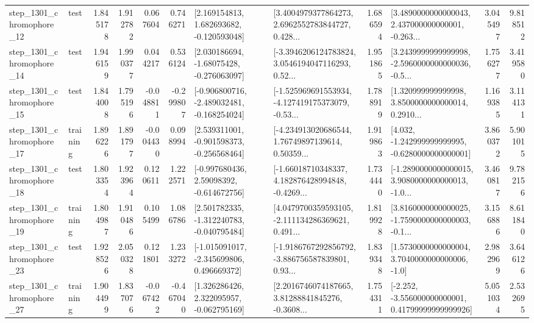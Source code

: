 \begin{tabular}{llrrrrllrlrr}
 step\_1301\_chromophore\_12 &      test &      1.845178 &    1.912782 &      0.067604 &  0.746271 &    [2.169154813, 1.682693682, -0.120593048] &  [3.4004979377864273, 2.6962552783844727, 0.428... &       1.686594 &  [3.4890000000000043, 2.437000000000001, -0.263... &            3.045497 &          9.818512 \\
 step\_1301\_chromophore\_14 &      test &      1.946159 &    1.990377 &      0.044217 &  0.536124 &    [2.030186694, -1.68075428, -0.276063097] &  [-3.3946206124783824, 3.0546194047116293, 0.52... &       1.951865 &  [3.2439999999999998, -2.5960000000000036, -0.5... &            1.756277 &          3.419580 \\
 step\_1301\_chromophore\_15 &      test &      1.844008 &    1.795196 &     -0.048811 & -0.299807 &  [-0.906800716, -2.489032481, -0.168254024] &  [-1.525969691553934, -4.127419175373079, -0.53... &       1.788919 &  [1.320999999999998, 3.8500000000000014, 0.2910... &            1.169385 &          3.114131 \\
 step\_1301\_chromophore\_17 &  training &      1.896226 &    1.891797 &     -0.004430 &  0.098994 &   [2.539311001, -0.901598373, -0.256568464] &  [-4.234913020686544, 1.76749897139614, 0.50359... &       1.919863 &   [4.032, -1.242999999999995, -0.6280000000000001] &            3.860372 &          5.901015 \\
 step\_1301\_chromophore\_18 &      test &      1.803354 &    1.923964 &      0.120611 &  1.222571 &    [-0.997680436, 2.59098392, -0.614672756] &  [-1.66018710348337, 4.182876428994848, -0.4269... &       1.734440 &  [-1.2890000000000015, 3.9080000000000013, -1.0... &            3.460817 &          9.782156 \\
 step\_1301\_chromophore\_19 &  training &      1.804987 &    1.910486 &      0.105499 &  1.086786 &   [2.501782335, -1.312240783, -0.040795484] &  [4.0479700359593105, -2.111134286369621, 0.491... &       1.819928 &  [3.8160000000000025, -1.7590000000000003, -0.1... &            3.156886 &          8.611840 \\
 step\_1301\_chromophore\_23 &      test &      1.928526 &    2.050328 &      0.121801 &  1.233272 &   [-1.015091017, -2.345699806, 0.496669372] &  [-1.9186767292856792, -3.886756587839801, 0.93... &       1.839348 &     [1.5730000000000004, 3.7040000000000006, -1.0] &            2.982969 &          3.646126 \\
 step\_1301\_chromophore\_27 &  training &      1.904499 &    1.837076 &     -0.067422 & -0.467040 &    [1.326286426, 2.322095957, -0.062795169] &  [2.2016746074187665, 3.81288841845276, -0.3608... &       1.754311 &  [-2.252, -3.556000000000001, 0.41799999999999926] &            5.051034 &          2.532695 \\

\end{tabular}
